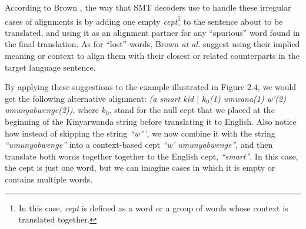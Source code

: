 According to Brown \etal\cite[p. 268]{brown1993mathematics}, the way that SMT decoders use to handle these irregular cases of alignments is by adding one empty \textit{cept}\footnote{In this case, \textit{cept} is defined as a word or a group of words whose context is translated together.} to the sentence about to be translated, and using it as an alignment partner for any ``spurious'' word found in the final translation. As for ``lost'' words, Brown \textit{at al.}\cite[p. 268]{brown1993mathematics} suggest using their implied meaning or context to align them with their closest or related counterparts in the target language sentence.


By applying these suggestions to the example illustrated in Figure $2.4$, we would get the following alternative alignment: \textit{(a smart kid $|$ $k_0$(1)  umwana(1) w'(2) umunyabwenge(2))}, where $k_0$, stand for the null cept that we placed at the beginning of the Kinyarwanda string before translating it to English. Also notice how instead of skipping the string \textit{``w'''}, we now combine it with the string \textit{``umunyabwenge''} into a context-based cept \textit{``w' umunyabwenge''}, and then translate both words together together to the English cept, \textit{``smart''}. In this case, the cept is just one word, but we can imagine cases in which it is empty or contains multiple words.


